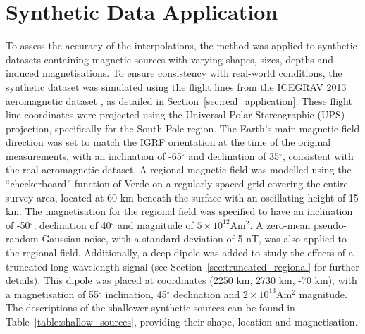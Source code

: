 \section{Synthetic Data Application}

To assess the accuracy of the interpolations, the method was applied to synthetic datasets containing magnetic sources with varying shapes, sizes, depths and induced magnetisations. To ensure consistency with real-world conditions, the synthetic dataset was simulated using the flight lines from the ICEGRAV 2013 aeromagnetic dataset \citep{ICEGRAV_data}, as detailed in Section~\ref{sec:real_application}. These flight line coordinates were projected using the Universal Polar Stereographic (UPS) projection, specifically for the South Pole region. The Earth's main magnetic field direction was set to match the IGRF orientation at the time of the original measurements, with an inclination of -65$^\circ$ and declination of 35$^\circ$, consistent with the real aeromagnetic dataset. A regional magnetic field was modelled using the ``checkerboard'' function of Verde  \citep{verde} on a regularly spaced grid covering the entire survey area, located at 60 km beneath the surface with an oscillating height of 15 km. The magnetisation for the regional field was specified to have an inclination of -50$^\circ$, declination of 40$^\circ$ and magnitude of $5 \times 10^{12}$Am$^2$. A zero-mean pseudo-random Gaussian noise, with a standard deviation of 5 nT, was also applied to the regional field. Additionally, a deep dipole was added to study the effects of a truncated long-wavelength signal (see Section~\ref{sec:truncated_regional} for further details). This dipole was placed at coordinates (2250 km, 2730 km, -70 km), with a magnetisation of 55$^\circ$ inclination, 45$^\circ$ declination and $2 \times 10^{13}$Am$^2$ magnitude. The descriptions of the shallower synthetic sources can be found in Table~\ref{table:shallow_sources}, providing their shape, location and magnetisation.

